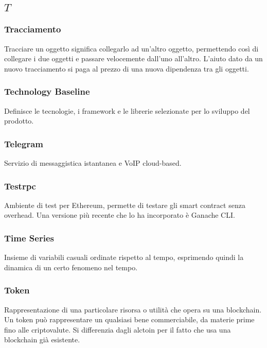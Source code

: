 \subsection*{\quad$T\quad$}
\subsubsection*{Tracciamento}
Tracciare un oggetto significa collegarlo ad un'altro oggetto, permettendo così di collegare i due oggetti e passare velocemente dall'uno all'altro. L'aiuto dato da un nuovo tracciamento si paga al prezzo di una nuova dipendenza tra gli oggetti.

\subsubsection*{Technology Baseline}
Definisce le tecnologie, i framework e le librerie selezionate per lo sviluppo del prodotto.

\subsubsection*{Telegram}
Servizio di messaggistica istantanea  e VoIP cloud-based.

\subsubsection*{Testrpc}
Ambiente di test per Ethereum, permette di testare gli smart contract senza overhead. Una versione più recente che lo ha incorporato è Ganache CLI\glo.

\subsubsection*{Time Series}
Insieme di variabili casuali ordinate rispetto al tempo, esprimendo quindi la dinamica di un certo fenomeno nel tempo.

\subsubsection*{Token}
Rappresentazione di una particolare risorsa o utilità che opera su una blockchain\glo. Un token può rappresentare un qualsiasi bene commerciabile, da materie prime fino alle criptovalute. Si differenzia dagli alctoin per il fatto che usa una blockchain già esistente.

